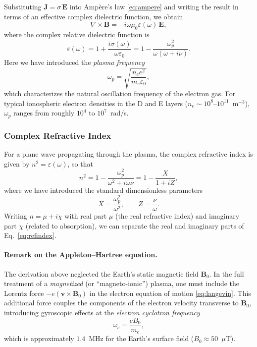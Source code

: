 \documentclass[12pt]{article}
\begin{document}
Substituting $\mathbf{J} = \sigma\,\mathbf{E}$ into Amp\`ere's law
\eqref{eq:ampere} and writing the result in terms of an effective complex dielectric
function, we obtain
\begin{equation}
  \nabla \times \mathbf{B} = -i\omega\mu_0\varepsilon(\omega)\,\mathbf{E},
\end{equation}
where the complex relative dielectric function is
\begin{equation}
  \varepsilon(\omega) = 1 + \frac{i\sigma(\omega)}{\omega\varepsilon_0}
                      = 1 - \frac{\omega_p^2}{\omega(\omega + i\nu)}.
  \label{eq:dielectric}
\end{equation}
Here we have introduced the \emph{plasma frequency}
\begin{equation}
  \omega_p = \sqrt{\frac{n_e e^2}{m_e \varepsilon_0}},
  \label{eq:plasma_freq}
\end{equation}
which characterizes the natural oscillation frequency of the electron gas.  For typical
ionospheric electron densities in the D and E layers ($n_e \sim 10^8$--$10^{11}$~m$^{-3}$),
$\omega_p$ ranges from roughly $10^4$ to $10^7$~rad/s.

\subsubsection{Complex Refractive Index}

For a plane wave propagating through the plasma, the complex refractive index is given by
$n^2 = \varepsilon(\omega)$, so that
\begin{equation}
  n^2 = 1 - \frac{\omega_p^2}{\omega^2 + i\omega\nu}
      = 1 - \frac{X}{1 + iZ},
  \label{eq:refindex}
\end{equation}
where we have introduced the standard dimensionless parameters
\begin{equation}
  X = \frac{\omega_p^2}{\omega^2}, \qquad Z = \frac{\nu}{\omega}.
  \label{eq:XZ}
\end{equation}
Writing $n = \mu + i\chi$ with real part $\mu$ (the real refractive index) and imaginary
part $\chi$ (related to absorption), we can separate the real and imaginary parts of
Eq.~\eqref{eq:refindex}.

\paragraph{Remark on the Appleton--Hartree equation.}
The derivation above neglected the Earth's static magnetic field $\mathbf{B}_0$.  In the
full treatment of a \emph{magnetized} (or ``magneto-ionic'') plasma, one must include the
Lorentz force $-e(\mathbf{v}\times\mathbf{B}_0)$ in the electron equation of motion
\eqref{eq:langevin}.  This additional force couples the components of the electron velocity
transverse to $\mathbf{B}_0$, introducing gyroscopic effects at the \emph{electron cyclotron
frequency}
\begin{equation}
  \omega_c = \frac{eB_0}{m_e},
  \label{eq:cyclotron}
\end{equation}
which is approximately $1.4$~MHz for the Earth's surface field ($B_0 \approx 50$~$\mu$T).
\end{document}
